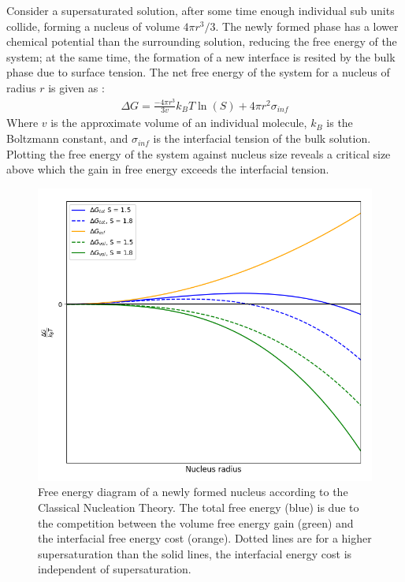 Consider a supersaturated solution, after some time enough individual
sub units collide, forming a nucleus of volume $4\pi r^3/3$. 
The newly formed phase has a lower chemical potential than the 
surrounding solution, reducing the free energy of the system; 
at the same time, the formation of a new interface is resited 
by the bulk phase due to surface tension. The net free energy 
of the system for a nucleus of radius $r$ is given as \cite{Karthika2016}:
\begin{align}
	\Delta G = \frac{-4\pi r^3}{3v}k_BT\ln(S) + 4\pi r^{2}\sigma_{inf} 
\end{align}
Where $v$ is the approximate volume of an individual molecule, $k_B$
is the Boltzmann constant, and $\sigma_{inf}$ is the interfacial 
tension of the bulk solution. Plotting the free energy of the system
against nucleus size reveals a critical size above which the gain 
in free energy exceeds the interfacial tension. 
\begin{figure}[h!]
	\centering
	\includegraphics[width=\linewidth]{Free_Energy_Diagram.png}
	\caption{Free energy diagram of a newly formed nucleus according 
		     to the Classical Nucleation Theory. The total free energy (blue)
		     is due to the competition between the volume free energy gain
		     (green) and the interfacial free energy cost (orange). Dotted
		     lines are for a higher supersaturation than the solid lines,
		     the interfacial energy cost is independent of supersaturation.}
\end{figure}

